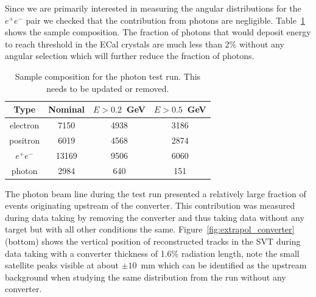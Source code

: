 
Since we are primarily interested in measuring the angular 
distributions for the $e^+e^-$ pair we checked that the contribution from photons are negligible. Table~\ref{tab:sample_composition} shows the sample composition. The fraction 
of photons that would deposit energy to reach threshold in the ECal crystals are much less than 2\% without any angular selection which will further reduce the fraction of photons. 
\begin{table}[]
\centering
\begin{tabular}{c|c|c|c}
Type & Nominal & $E>0.2$~GeV & $E>0.5$~GeV \\
\hline
electron & 7150 & 4938 & 3186 \\
positron & 6019 & 4568 & 2874 \\
$e^+e^-$ & 13169 & 9506 & 6060 \\
photon & 2984 & 640 & 151 \\
\hline
\end{tabular}
\caption{Sample composition for the photon test run. {\color{red} This needs to be updated 
or removed.}}
\label{tab:sample_composition}
\end{table}

The photon beam line during the test run presented a relatively large fraction of events 
originating upstream of the converter. This contribution was measured during data taking by 
removing the converter and thus taking data without any target but with all other conditions 
the same. Figure~\ref{fig:extrapol_converter} (bottom) shows the vertical position of 
reconstructed tracks in the SVT during data taking with a converter thickness of 
1.6\% radiation length, note the small satellite peaks visible at about $\pm 10$~mm which 
can be identified as the upstream background when studying the same distribution from the 
run without any converter. 

